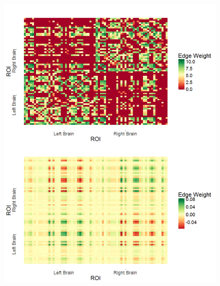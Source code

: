 \documentclass[simplex.tex]{subfiles}
\begin{document}
\begin{figure}[!h]
\begin{cframed}
\centering
\includegraphics[scale=0.25, clip = true, trim = 0 7in 0 .5in]{../../figs/cci_data.png}

\end{cframed}
\end{figure}
\end{document}

